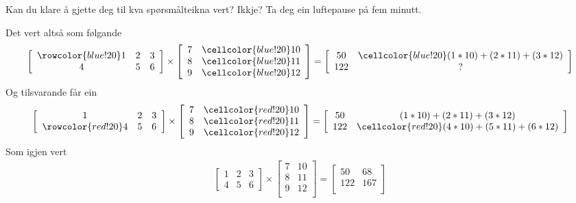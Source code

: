 \documentclass[12pt]{article}
\newcommand\x{\times}
\newcommand\y{\cellcolor{blue!20}}
\newcommand\z{\cellcolor{red!20}}
\begin{document}
Kan du klare å gjette deg til kva spørsmålteikna vert?
Ikkje? Ta deg ein luftepause på fem minutt.

Det vert altså som følgande
\begin{gather*}
\left[ 
\begin{array}{ccc}
\rowcolor{blue!20}
1 & 2 & 3 \\
4 & 5 & 6
\end{array}
 \right] \x
\left[ 
\begin{array}{ccc}
7 & \y 10 \\
8 & \y 11 \\
9 & \y 12 \\
\end{array}\right]
= 
\left[ 
\begin{array}{ccc}
50 & \y (1*10) + (2*11) + (3*12) \\
122 & ? \\
\end{array}\right]
\end{gather*}
Og tilsvarande får ein
\begin{gather*}
\left[ 
\begin{array}{ccc}
1 & 2 & 3 \\
\rowcolor{red!20}
4 & 5 & 6
\end{array}
 \right] \x
\left[ 
\begin{array}{ccc}
7 & \z 10 \\
8 & \z 11 \\
9 & \z 12 \\
\end{array}\right]
= 
\left[ 
\begin{array}{ccc}
50 & (1*10) + (2*11) + (3*12) \\
122 & \z (4*10) + (5*11) + (6*12) \\
\end{array}\right]
\end{gather*}
Som igjen vert
\begin{gather*}
\left[ 
\begin{array}{ccc}
1 & 2 & 3 \\
4 & 5 & 6
\end{array}
 \right] \x
\left[ 
\begin{array}{ccc}
7 & 10 \\
8 & 11 \\
9 & 12 \\
\end{array}\right]
= 
\left[ 
\begin{array}{ccc}
50 & 68 \\
122 & 167 \\
\end{array}\right]
\end{gather*}
\end{document}
